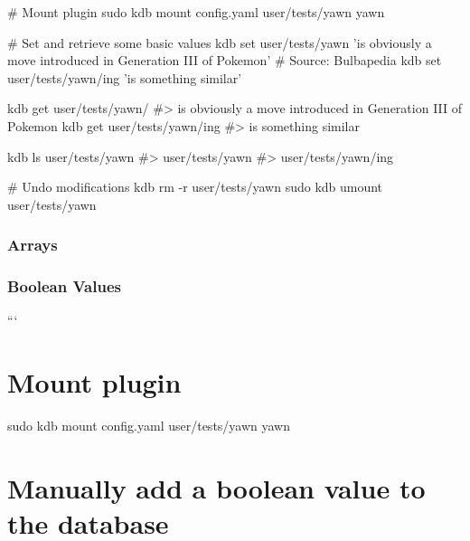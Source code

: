 \begin{DoxyCode}
# Mount plugin
sudo kdb mount config.yaml user/tests/yawn yawn

# Set and retrieve some basic values
kdb set user/tests/yawn 'is obviously a move introduced in Generation III of Pokemon' # Source: Bulbapedia
kdb set user/tests/yawn/ing 'is something similar'

kdb get user/tests/yawn/
#> is obviously a move introduced in Generation III of Pokemon
kdb get user/tests/yawn/ing
#> is something similar

kdb ls user/tests/yawn
#> user/tests/yawn
#> user/tests/yawn/ing

# Undo modifications
kdb rm -r user/tests/yawn
sudo kdb umount user/tests/yawn
\end{DoxyCode}


\subsubsection*{Arrays}




\subsubsection*{Boolean Values}

``` \section*{Mount plugin}

sudo kdb mount config.\+yaml user/tests/yawn yawn

\section*{Manually add a boolean value to the database}

